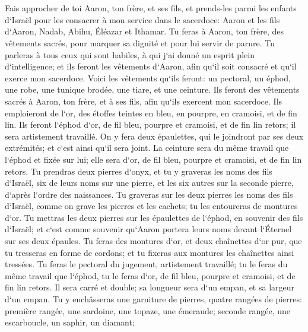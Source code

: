 \chapter{}

\verse Fais approcher de toi Aaron, ton frère, et ses fils, et prends-les parmi les enfants d`Israël pour les consacrer à mon service dans le sacerdoce: Aaron et les fils d`Aaron, Nadab, Abihu, Éléazar et Ithamar. 
\verse Tu feras à Aaron, ton frère, des vêtements sacrés, pour marquer sa dignité et pour lui servir de parure. 
\verse Tu parleras à tous ceux qui sont habiles, à qui j`ai donné un esprit plein d`intelligence; et ils feront les vêtements d`Aaron, afin qu`il soit consacré et qu`il exerce mon sacerdoce. 
\verse Voici les vêtements qu`ils feront: un pectoral, un éphod, une robe, une tunique brodée, une tiare, et une ceinture. Ils feront des vêtements sacrés à Aaron, ton frère, et à ses fils, afin qu`ils exercent mon sacerdoce. 
\verse Ils emploieront de l`or, des étoffes teintes en bleu, en pourpre, en cramoisi, et de fin lin. 
\verse Ils feront l`éphod d`or, de fil bleu, pourpre et cramoisi, et de fin lin retors; il sera artistement travaillé. 
\verse On y fera deux épaulettes, qui le joindront par ses deux extrémités; et c`est ainsi qu`il sera joint. 
\verse La ceinture sera du même travail que l`éphod et fixée sur lui; elle sera d`or, de fil bleu, pourpre et cramoisi, et de fin lin retors. 
\verse Tu prendras deux pierres d`onyx, et tu y graveras les noms des fils d`Israël, 
\verse six de leurs noms sur une pierre, et les six autres sur la seconde pierre, d`après l`ordre des naissances. 
\verse Tu graveras sur les deux pierres les noms des fils d`Israël, comme on grave les pierres et les cachets; tu les entoureras de montures d`or. 
\verse Tu mettras les deux pierres sur les épaulettes de l`éphod, en souvenir des fils d`Israël; et c`est comme souvenir qu`Aaron portera leurs noms devant l`Éternel sur ses deux épaules. 
\verse Tu feras des montures d`or, 
\verse et deux chaînettes d`or pur, que tu tresseras en forme de cordons; et tu fixeras aux montures les chaînettes ainsi tressées. 
\verse Tu feras le pectoral du jugement, artistement travaillé; tu le feras du même travail que l`éphod, tu le feras d`or, de fil bleu, pourpre et cramoisi, et de fin lin retors. 
\verse Il sera carré et double; sa longueur sera d`un empan, et sa largeur d`un empan. 
\verse Tu y enchâsseras une garniture de pierres, quatre rangées de pierres: première rangée, une sardoine, une topaze, une émeraude; 
\verse seconde rangée, une escarboucle, un saphir, un diamant; 
